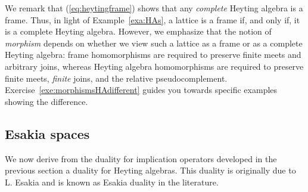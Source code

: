 We remark that (\ref{eq:heytingframe}) shows that any \emph{complete} Heyting algebra is a frame. Thus, in light of Example~\ref{exa:HAs}, a lattice is a frame if, and only if, it is a complete Heyting algebra. However, we emphasize that the notion of \emph{morphism} depends on whether we view such a lattice as a frame or as a complete Heyting algebra: frame homomorphisms are required to preserve finite meets and arbitrary joins, whereas Heyting algebra homomorphisms are required to preserve finite meets, \emph{finite} joins, and the relative pseudocomplement. Exercise~\ref{exe:morphismsHAdifferent} guides you towards specific examples showing the difference.



\subsection*{Esakia spaces}
We now derive from the duality for implication operators developed in the previous section a duality for Heyting algebras. This duality is originally due to L. Esakia and is known as Esakia duality in the literature.

